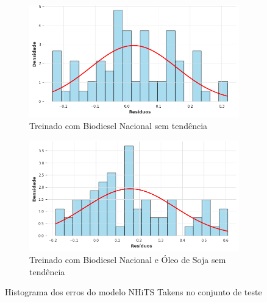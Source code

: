 \begin{figure}[htbp]
	\begin{subfigure}[b]{0.40\textwidth}
		\centering
		\includegraphics[width=\textwidth]{figuras/nhits_takens_brasil_detrend_residuals_histogram.png} %
		\caption{Treinado com Biodiesel Nacional sem tendência}
		\label{fig:nhits_takens_brasil_detrend_residuals_histogram}
	\end{subfigure}
	\hfill
	\begin{subfigure}[b]{0.40\textwidth}
		\centering
		\includegraphics[width=\textwidth]{figuras/nhits_takens_brasil_oil_detrend_residuals_histogram.png} %
		\caption{Treinado com Biodiesel Nacional e Óleo de Soja sem tendência}
		\label{fig:nhits_takens_brasil_oil_detrend_residuals_histogram}
	\end{subfigure}

	\caption{Histograma dos erros do modelo \acs{NHiTS} Takens no conjunto de teste}
	\label{fig:nhits_takens_residuals_histogram}
\end{figure}

